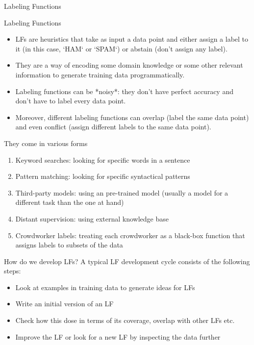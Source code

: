 \documentclass{beamer}
\begin{document}
\begin{frame}{}
    \Large Labeling Functions
\end{frame}

\begin{frame}{Labeling Functions}
    \begin{itemize}
        \item LFs are heuristics that take as input a data point and either assign a label to it (in this case, `HAM` or `SPAM`) or abstain (don't assign any label). \pause
        \item They are a way of encoding some domain knowledge or some other relevant information to generate training data programmatically. \pause
        \item Labeling functions can be *noisy*: they don't have perfect accuracy and don't have to label every data point.
        \item  Moreover, different labeling functions can overlap (label the same data point) and even conflict (assign different labels to the same data point).
    \end{itemize}
\end{frame}

\begin{frame}{They come in various forms}
\begin{enumerate}
    \item Keyword searches: looking for specific words in a sentence
    \item Pattern matching: looking for specific syntactical patterns
    \item Third-party models: using an pre-trained model (usually a model for a different task than the one at hand)
    \item Distant supervision: using external knowledge base
    \item Crowdworker labels: treating each crowdworker as a black-box function that assigns labels to subsets of the data
\end{enumerate} 
\end{frame}

\begin{frame}{How do we develop LFs?}
A typical LF development cycle consists of the following steps:
\begin{itemize}
    \item  Look at examples in training data to generate ideas for LFs
    \item  Write an initial version of an LF
    \item Check how this dose in terms of its coverage, overlap with other LFs etc.
    \item Improve the LF or look for a new LF by inspecting the data further
\end{itemize}
\end{frame}
\end{document}

